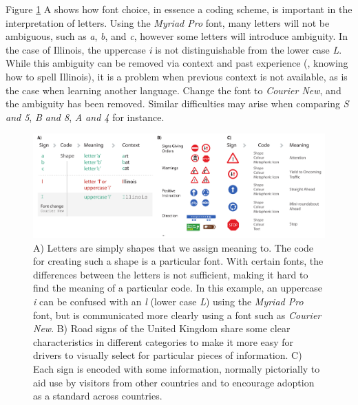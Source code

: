 Figure \ref{fig:signs-code} A shows how font choice, in essence a coding scheme, is important in the interpretation of letters. 
Using the \emph{Myriad Pro} font, many letters will not be ambiguous, such as \emph{a}, \emph{b}, and \emph{c}, however some letters will introduce ambiguity.
In the case of Illinois, the uppercase \emph{i} is not distinguishable from the lower case \emph{L}. 
While this ambiguity can be removed via context and past experience (\eg, knowing how to spell Illinois), it is a problem when previous context is not available, as is the case when learning another language. 
Change the font to \emph{Courier New}, and the ambiguity has been removed. 
Similar difficulties may arise when comparing \emph{\emph{S} and \emph{5}}, \emph{\emph{B} and \emph{8}}, \emph{\emph{A} and \emph{4}} for instance.

\begin{figure}[t!]
\centering
\includegraphics[width=\textwidth]{images/related-work/glyphs/signs-codes}
\caption{A) Letters are simply shapes that we assign meaning to. 
The code for creating such a shape is a particular font. 
With certain fonts, the differences between the letters is not sufficient, making it hard to find the meaning of a particular code. 
In this example, an uppercase \emph{i} can be confused with an \emph{l} (lower case \emph{L}) using the \emph{Myriad Pro} font, but is communicated more clearly using a font such as \emph{Courier New}. 
B) Road signs of the United Kingdom share some clear characteristics in different categories to make it more easy for drivers to visually select for particular pieces of information. 
C) Each sign is encoded with some information, normally pictorially to aid use by visitors from other countries and to encourage adoption as a standard across countries.}
\label{fig:signs-code}
\end{figure}


